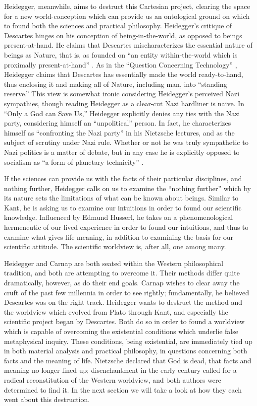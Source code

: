 \documentclass[leqno, 12pt]{turabian-researchpaper}
\begin{document}
	Heidegger, meanwhile, aims to destruct this Cartesian project, clearing the space
	for a new world-conception which can provide us an ontological ground on which
	to found both the sciences and practical philosophy. Heidegger's critique of
	Descartes hinges on his conception of being-in-the-world, as opposed to beings
	present-at-hand. He claims that Descartes mischaracterizes the essential
	nature of beings as Nature, that is, as founded on \enquote{an entity within-the-world which is proximally present-at-hand}
	\autocite[H. 95]{heidegger2008a}. As in the \enquote{Question Concerning Technology}
	\autocite{heidegger2008c}, Heidegger claims that Descartes has essentially
	made the world ready-to-hand, thus enclosing it and making all of Nature,
	including man, into \enquote{standing reserve.} This view is somewhat ironic
	considering Heidegger's perceived Nazi sympathies, though reading Heidegger as
	a clear-cut Nazi hardliner is naive. In \enquote{Only a God can Save Us,} Heidegger
	explicitly denies any ties with the Nazi party, considering himself an
	\enquote{unpolitical} person. In fact, he characterizes himself as \enquote{confronting the Nazi party}
	in his Nietzsche lectures, and as the subject of scrutiny under Nazi rule.
	Whether or not he was truly sympathetic to Nazi politics is a matter of debate,
	but in any case he is explicitly opposed to socialism as \enquote{a form of planetary technicity}
	\autocite[p. 206]{heidegger1981}.

	If the sciences can provide us with the facts of their particular disciplines,
	and nothing further, Heidegger calls on us to examine the \enquote{nothing further}
	which by its nature sets the limitations of what can be known about beings. Similar
	to Kant, he is asking us to examine our intuitions in order to found our
	scientific knowledge. Influenced by Edmund Husserl, he takes on a
	phenomenological hermeneutic of our lived experience in order to found our
	intuitions, and thus to examine what gives life meaning, in addition to
	examining the basis for our scientific attitude. The scientific worldview is,
	after all, one among many.

	Heidegger and Carnap are both seated within the Western philosophical tradition,
	and both are attempting to overcome it. Their methods differ quite dramatically,
	however, as do their end goals. Carnap wishes to clear away the cruft of the
	past few millennia in order to see rightly; fundamentally, he believed
	Descartes was on the right track. Heidegger wants to destruct the method and the
	worldview which evolved from Plato through Kant, and especially the scientific
	project began by Descartes. Both do so in order to found a worldview which is capable
	of overcoming the existential conditions which underlie false metaphysical inquiry.
	These conditions, being existential, are immediately tied up in both material
	analysis and practical philosophy, in questions concerning both facts and the meaning
	of life. Nietzsche declared that God is dead, that facts and meaning no longer
	lined up; disenchantment in the early  century called for a radical reconstitution
	of the Western worldview, and both authors were determined to find it. In the next
	section we will take a look at how they each went about this destruction.
\end{document}
